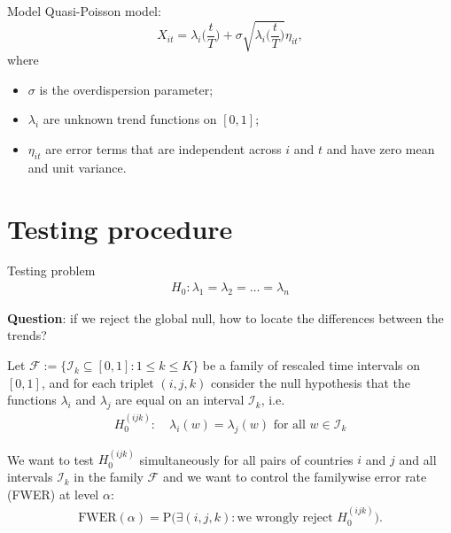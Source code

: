 \documentclass[10pt]{beamer}
\newcommand{\Prob}{\mathrm{P}}
\begin{document}
\begin{frame}{Model}
Quasi-Poisson model:
\begin{equation*}
X_{it} = \lambda_i \Big( \frac{t}{T} \Big) + \sigma\sqrt{\lambda_i \Big( \frac{t}{T} \Big)} \eta_{it},
\end{equation*}\pause
\vspace{-3mm}
where
\begin{itemize}
\item $\sigma$ is the overdispersion parameter;\pause
\item $\lambda_i$ are unknown trend functions on $[0,1]$;\pause
\item $\eta_{it}$ are error terms that are independent across $i$ and $t$ and have zero mean and unit variance.
\end{itemize}
\end{frame}

\section{Testing procedure}
\begin{frame}{Testing problem}
\begin{align*}
H_0: \lambda_1 = \lambda_2 = \ldots = \lambda_n
\end{align*}\pause

\vspace{-6mm}
\textbf{Question}: if we reject the global null, how to locate the differences between the trends? \pause


Let $\mathcal{F} :=\{ \mathcal{I}_k \subseteq [0, 1]: 1 \le k \le K\}$ be a family of rescaled time intervals on $[0, 1]$, and for each triplet $(i, j, k)$ consider the null hypothesis that the functions $\lambda_i$ and $\lambda_j$ are equal on an interval $\mathcal{I}_k$\pause, i.e.
\begin{align*}
H_0^{(ijk)}:\quad  \lambda_i(w) = \lambda_j(w) \text{ for all } w\in \mathcal{I}_k
\end{align*}\pause
\vspace{-2mm}

We want to test $H_0^{(ijk)}$ simultaneously for all pairs of countries $i$ and $j$ and all intervals $\mathcal{I}_k$ in the family $\mathcal{F}$ and we want to control the familywise error rate (FWER) at level $\alpha$:
\begin{align*}
\text{FWER}(\alpha) = \Prob \Big( \exists (i,j,k): \text{we wrongly reject } H_0^{(ijk)} \Big).
\end{align*}
\end{frame} 
\end{document}
